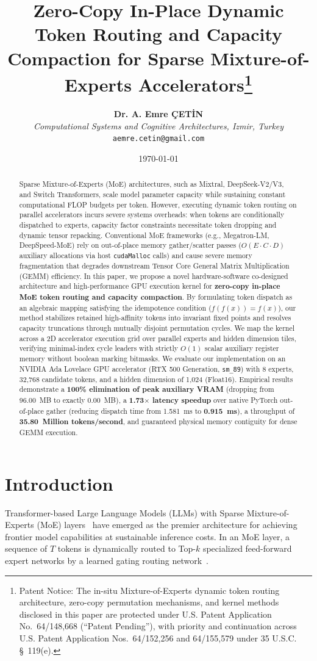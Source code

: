 \documentclass[10pt,twocolumn]{article}
\title{\textbf{Zero-Copy In-Place Dynamic Token Routing and Capacity Compaction for Sparse Mixture-of-Experts Accelerators}\thanks{Patent Notice: The in-situ Mixture-of-Experts dynamic token routing architecture, zero-copy permutation mechanisms, and kernel methods disclosed in this paper are protected under U.S. Patent Application No.~64/148,668 (``Patent Pending''), with priority and continuation across U.S. Patent Application Nos.~64/152,256 and 64/155,579 under 35 U.S.C. \S~119(e).}}
\author{
    \textbf{Dr. A. Emre \c{C}ET\.{I}N}\\
    \textit{Computational Systems and Cognitive Architectures, Izmir, Turkey}\\
    \texttt{aemre.cetin@gmail.com}
}
\date{\today}
\begin{document}
\maketitle

\begin{abstract}
Sparse Mixture-of-Experts (MoE) architectures, such as Mixtral, DeepSeek-V2/V3, and Switch Transformers, scale model parameter capacity while sustaining constant computational FLOP budgets per token. However, executing dynamic token routing on parallel accelerators incurs severe systems overheads: when tokens are conditionally dispatched to experts, capacity factor constraints necessitate token dropping and dynamic tensor repacking. Conventional MoE frameworks (e.g., Megatron-LM, DeepSpeed-MoE) rely on out-of-place memory gather/scatter passes ($O(E \cdot C \cdot D)$ auxiliary allocations via host \texttt{cudaMalloc} calls) and cause severe memory fragmentation that degrades downstream Tensor Core General Matrix Multiplication (GEMM) efficiency. In this paper, we propose a novel hardware-software co-designed architecture and high-performance GPU execution kernel for \textbf{zero-copy in-place MoE token routing and capacity compaction}. By formulating token dispatch as an algebraic mapping satisfying the idempotence condition ($f(f(x)) = f(x)$), our method stabilizes retained high-affinity tokens into invariant fixed points and resolves capacity truncations through mutually disjoint permutation cycles. We map the kernel across a 2D accelerator execution grid over parallel experts and hidden dimension tiles, verifying minimal-index cycle leaders with strictly $O(1)$ scalar auxiliary register memory without boolean marking bitmasks. We evaluate our implementation on an NVIDIA Ada Lovelace GPU accelerator (RTX 500 Generation, \texttt{sm\_89}) with 8 experts, 32,768 candidate tokens, and a hidden dimension of 1,024 (Float16). Empirical results demonstrate a \textbf{100\% elimination of peak auxiliary VRAM} (dropping from 96.00~MB to exactly 0.00~MB), a \textbf{1.73$\times$ latency speedup} over native PyTorch out-of-place gather (reducing dispatch time from 1.581~ms to \textbf{0.915~ms}), a throughput of \textbf{35.80~Million tokens/second}, and guaranteed physical memory contiguity for dense GEMM execution.
\end{abstract}

\section{Introduction}
\label{sec:intro}
Transformer-based Large Language Models (LLMs) with Sparse Mixture-of-Experts (MoE) layers~\cite{jiang2024mixtral, deepseek2024deepseek, fedus2022switch} have emerged as the premier architecture for achieving frontier model capabilities at sustainable inference costs. In an MoE layer, a sequence of $T$ tokens is dynamically routed to Top-$k$ specialized feed-forward expert networks by a learned gating routing network~\cite{lepikhin2020gshard}.
\end{document}
